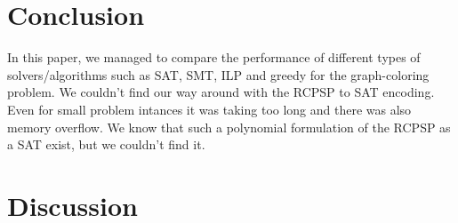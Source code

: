 \documentclass{sig-alternate}
\begin{document}
\section{Conclusion}
In this paper, we managed to compare the performance of different types of solvers/algorithms such as SAT, SMT, ILP and greedy for the graph-coloring problem.
We couldn't find our way around with the RCPSP to SAT encoding. Even for small problem intances it was taking too long and there was also memory overflow. We know that such a polynomial formulation of the RCPSP as a SAT exist, but we couldn't find it.
\section{Discussion}
\end{document}
